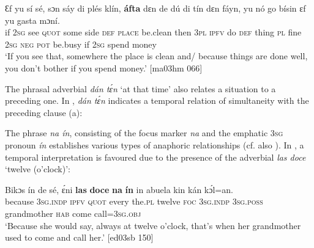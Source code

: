\ea%
    \label{ex:key:1358}
    \gll Ɛf  yu  sí  sé,    sɔn    sáy  di  plés    klín,    \textbf{áfta}    dɛn  de  dú  
di  tín    dɛn  fáyn,  yu  nó  go  bísin  ɛf  yu  gasta  mɔní.\\
if  \textsc{2sg}  see  \textsc{quot}    some  side  \textsc{def}  \textsc{place}  be.clean  then  \textsc{3pl}  \textsc{ipfv}  do  
\textsc{def}  thing  \textsc{pl}  fine    \textsc{2sg}  \textsc{neg}  \textsc{pot}  be.busy  if  \textsc{2sg}  spend  money\\

\glt ‘If you see that, somewhere the place is clean and/ because things are done well, 
you don’t bother if you spend money.’ [ma03hm 066]
\z

The phrasal adverbial \textit{dán tɛ́n} ‘at that time’ also relates a situation to a preceding one. In , \textit{dán tɛ́n} indicates a temporal relation of simultaneity with the preceding clause (a):


\ea%
    \label{ex:key:1359}
\z\z

The phrase \textit{na ín}, consisting of the focus marker \textit{na} and the emphatic \textsc{3sg} pronoun \textit{ín} establishes various types of anaphoric relationships (cf. also ). In , a temporal interpretation is favoured due to the presence of the adverbial \textit{las doce} ‘twelve (o’clock)’:


\ea%
    \label{ex:key:1360}
    \gll Bikɔs  ín    de  sé,    ɛ́ni    \textbf{las}    \textbf{doce}  \textbf{na}  \textbf{ín}    in
abuela    kin  kán    kɔ́l=an.\\
because  \textsc{3sg.indp}  \textsc{ipfv}  \textsc{quot}    every  the.\textsc{pl}  twelve  \textsc{foc}  \textsc{3sg.indp}  \textsc{3sg.poss}
grandmother  \textsc{hab}  come  call=\textsc{3sg.obj}\\

\glt ‘Because she would say, always at twelve o’clock, that’s when her 
grandmother used to come and call her.’ [ed03sb 150]
\z

